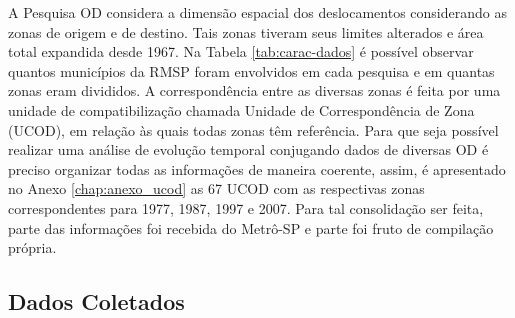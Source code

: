 A Pesquisa OD considera a dimensão espacial dos deslocamentos considerando as zonas de origem e de destino. Tais zonas tiveram seus limites alterados e área total expandida desde 1967. Na Tabela \ref{tab:carac-dados} é possível observar quantos municípios da RMSP foram envolvidos em cada pesquisa e em quantas zonas eram divididos. A correspondência entre as diversas zonas é feita por uma unidade de compatibilização chamada Unidade de Correspondência de Zona (UCOD), em relação às quais todas zonas têm referência. Para que seja possível realizar uma análise de evolução temporal conjugando dados de diversas OD é preciso organizar todas as informações de maneira coerente, assim, é apresentado no Anexo \ref{chap:anexo_ucod} as 67 UCOD  com as respectivas zonas correspondentes para 1977, 1987, 1997 e 2007. Para tal consolidação ser feita, parte das informações foi recebida do Metrô-SP e parte foi fruto de compilação própria.


\begin{table}[htb]
\end{table}


\subsection{Dados Coletados}\label{subsec:dados-coletados}


